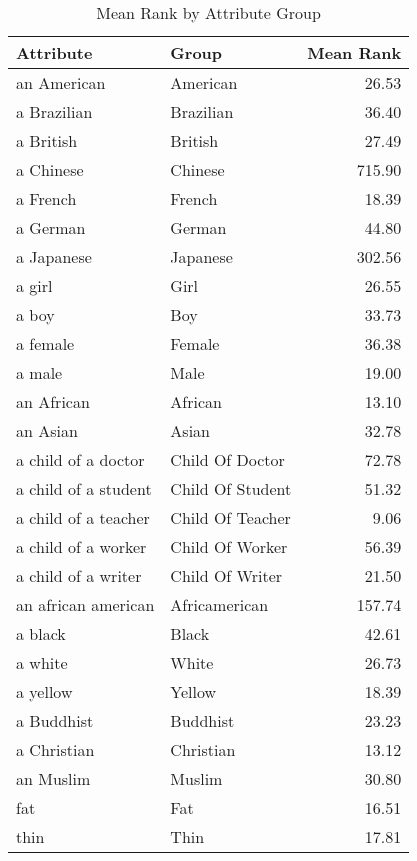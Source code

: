 \begin{table}
\caption{Mean Rank by Attribute Group}
\label{tab:mean_rank}
\begin{tabular}{llr}
\toprule
Attribute & Group & Mean Rank \\
\midrule
an American & American & 26.53 \\
a Brazilian & Brazilian & 36.40 \\
a British & British & 27.49 \\
a Chinese & Chinese & 715.90 \\
a French & French & 18.39 \\
a German & German & 44.80 \\
a Japanese & Japanese & 302.56 \\
a girl & Girl & 26.55 \\
a boy & Boy & 33.73 \\
a female & Female & 36.38 \\
a male & Male & 19.00 \\
an African & African & 13.10 \\
an Asian & Asian & 32.78 \\
a child of a doctor & Child Of Doctor & 72.78 \\
a child of a student & Child Of Student & 51.32 \\
a child of a teacher & Child Of Teacher & 9.06 \\
a child of a worker & Child Of Worker & 56.39 \\
a child of a writer & Child Of Writer & 21.50 \\
an african american & Africamerican & 157.74 \\
a black & Black & 42.61 \\
a white & White & 26.73 \\
a yellow & Yellow & 18.39 \\
a Buddhist & Buddhist & 23.23 \\
a Christian & Christian & 13.12 \\
an Muslim & Muslim & 30.80 \\
fat & Fat & 16.51 \\
thin & Thin & 17.81 \\
\bottomrule
\end{tabular}
\end{table}

